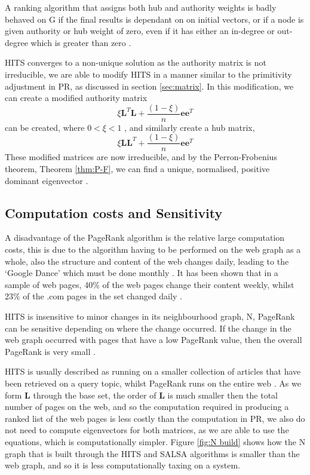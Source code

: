 \documentclass[11pt]{report}
\begin{document}
A ranking algorithm that assigns both hub and authority weights is badly behaved on G if the final results is dependant on on initial vectors, or if a node is given authority or hub weight of zero, even if it has either an in-degree or out-degree which is greater than zero \cite{bonato}.

HITS converges to a non-unique solution as the authority matrix is not irreducible, we are able to modify HITS in a manner similar to the primitivity adjustment in PR, as discussed in section \ref{sec:matrix}. In this modification, we can create a modified authority matrix 
\[\xi\textbf{L}^T\textbf{L} +\frac{(1-\xi)}{n}\textbf{ee}^T\] 
can be created, where $0<\xi<1$ \cite{ng2001stable}, and similarly create a hub matrix,
\[\xi\textbf{LL}^T +\frac{(1-\xi)}{n}\textbf{ee}^T\] 
These modified matrices are now irreducible, and by the Perron-Frobenius theorem, Theorem \ref{thm:P-F}, we can find a unique, normalised, positive dominant eigenvector \cite{meyer2000matrix}.

\subsection*{Computation costs and Sensitivity}
A disadvantage of the PageRank algorithm is the relative large computation costs, this is due to the algorithm having to be performed on the web graph as a whole, also the structure and content of the web changes daily, leading to the `Google Dance' which must be done monthly \cite{thorson2004modeling}. It has been shown that in a sample of web pages, 40\% of the web pages change their content weekly, whilst 23\% of the .com pages in the set changed daily \cite{cho1999evolution}. 

HITS is insensitive to minor changes in its neighbourhood graph, N, PageRank can be sensitive depending on where the change occurred. If the change in the web graph occurred with pages that have a low PageRank value, then the overall PageRank is very small \cite{ng2001stable}.

HITS is usually described as running on a smaller collection of articles that have been retrieved on a query topic, whilst PageRank runs on the entire web \cite{ng2001link}. As we form \textbf{L} through the base set, the order of \textbf{L} is much smaller then the total number of pages on the web, and so the computation required in producing a ranked list of the web pages is less costly than the computation in PR, we also do not need to compute eigenvectors for both matrices, as we are able to use the equations, which is computationally simpler. Figure \ref{fig:N build} shows how the N graph that is built through the HITS and SALSA algorithms is smaller than the web graph, and so it is less computationally taxing on a system.
\end{document}
